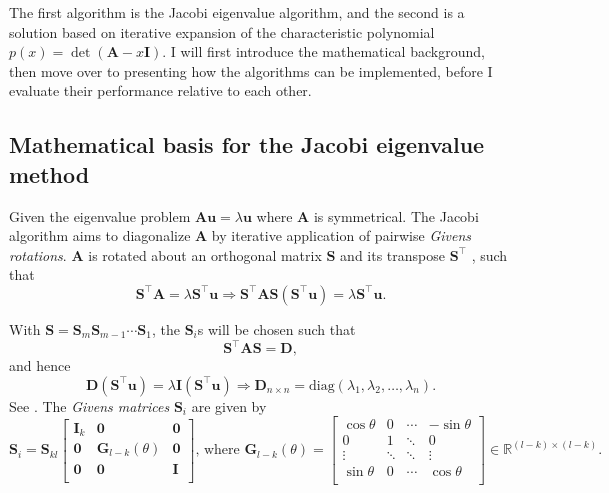 \documentclass[]{article}
\begin{document}
The first algorithm is the Jacobi eigenvalue algorithm, and the second is a solution based on iterative expansion of the characteristic polynomial $p(x) = \det(\mathbf{A} - x\mathbf{I})$. I will first introduce the mathematical background, then move over to presenting how the algorithms can be implemented, before I evaluate their performance relative to each other.

\subsection{Mathematical basis for the Jacobi eigenvalue method}
Given the eigenvalue problem $\mathbf{Au} = \lambda \mathbf{u}$ where $\mathbf{A}$ is symmetrical. The Jacobi algorithm aims to diagonalize $\mathbf{A}$ by iterative application of pairwise \textit{Givens rotations}. $\mathbf{A}$ is rotated about an orthogonal matrix $\mathbf{S}$ and its transpose $\mathbf{S}^\intercal$ , such that 
\[
\mathbf{S}^\intercal \mathbf{A} = \lambda \mathbf{S}^\intercal \mathbf{u} \Rightarrow \mathbf{S}^\intercal \mathbf{A} \mathbf{S} (\mathbf{S}^\intercal \mathbf{u})= \lambda \mathbf{S}^\intercal \mathbf{u}.
\]

With $\mathbf{S} = \mathbf{S}_m \mathbf{S}_{m-1} \cdots \mathbf{S}_1$, the $\mathbf{S}_i$s will be chosen such that
\[
\mathbf{S}^\intercal \mathbf{A} \mathbf{S} = \mathbf{D}, 
\]
and hence
\[
\mathbf{D} (\mathbf{S}^\intercal \mathbf{u})= \lambda \mathbf{I} (\mathbf{S}^\intercal \mathbf{u}) \Rightarrow \mathbf{D}_{n \times n} = \mathrm{diag}(\lambda_1, \lambda_2, \ldots, \lambda_n).
\]
See \cite{fys4150-notes}. The \textit{Givens matrices} \cite{mat-inf4130} $\mathbf{S}_i$ are given by
\begin{equation*}
\mathbf{S}_i = \mathbf{S}_{kl}
\begin{bmatrix}
\mathbf{I}_k & \mathbf{0} & \mathbf{0} \\
\mathbf{0} & \mathbf{G}_{l-k}(\theta) & \mathbf{0} \\
\mathbf{0} & \mathbf{0} & \mathbf{I} \\
\end{bmatrix}
\text{, where }
\mathbf{G}_{l-k}(\theta) = 
\begin{bmatrix}
\cos \theta 	& 0 		& \cdots 		& -\sin \theta \\
0 				& 1 		& \ddots 		& 0 \\
\vdots 			& \ddots	& \ddots 		& \vdots \\
\sin \theta 	& 0 		& \cdots 		& \cos \theta \\
\end{bmatrix} \in \mathbb{R}^{(l-k) \times (l-k)}.
\end{equation*}
\end{document}
